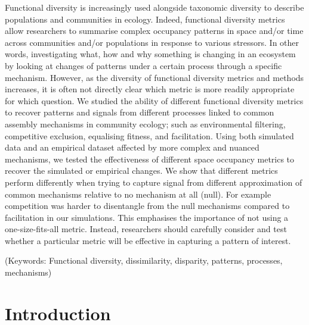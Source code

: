 \documentclass[12pt,letterpaper]{article}
\begin{document}
Functional diversity is increasingly used alongside taxonomic diversity to describe populations and communities in ecology.
Indeed, functional diversity metrics allow researchers to summarise complex occupancy patterns in space and/or time across communities and/or populations in response to various stressors.
In other words, investigating what, how and why something is changing in an ecosystem by looking at changes of patterns under a certain process through a specific mechanism.
However, as the diversity of functional diversity metrics and methods increases, it is often not directly clear which metric is more readily appropriate for which question.
We studied the ability of different functional diversity metrics to recover patterns and signals from different processes linked to common assembly mechanisms in community ecology; such as environmental filtering, competitive exclusion, equalising fitness, and facilitation.
Using both simulated data and an empirical dataset affected by more complex and nuanced mechanisms, we tested the effectiveness of different space occupancy metrics to recover the simulated or empirical changes.
We show that different metrics perform differently when trying to capture signal from different approximation of common mechanisms relative to no mechanism at all (null).
For example competition was harder to disentangle from the null mechanisms compared to facilitation in our simulations.
This emphasises the importance of not using a one-size-fits-all metric.
Instead, researchers should carefully consider and test whether a particular metric will be effective in capturing a pattern of interest.

\noindent (Keywords: Functional diversity, dissimilarity, disparity, patterns, processes, mechanisms)\\

\newpage

\section{Introduction}
\end{document}
